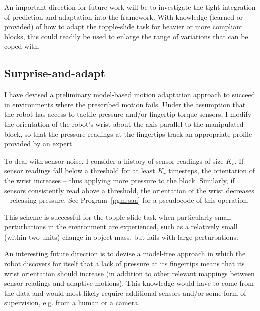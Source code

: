 An important direction for future work will be to investigate the tight integration of prediction and adaptation into the framework.  
With knowledge (learned or provided) of how to adapt the topple-slide task for heavier or more compliant blocks, this could readily be used to enlarge the range of variations that can be coped with. 

\subsection*{Surprise-and-adapt}
I have devised a preliminary model-based motion adaptation approach to succeed in environments where the prescribed motion fails.
Under the assumption that the robot has access to tactile pressure and/or fingertip torque sensors, I modify the orientation of the robot's wrist about the axis parallel to the manipulated block, so that the pressure readings at the fingertips track an appropriate profile provided by an expert.

To deal with sensor noise, I consider a history of sensor readings of size $K_r$.
If sensor readings fall below a threshold for at least $K_r$ timesteps, the orientation of the wrist increases -- thus applying more pressure to the block.
Similarly, if sensors consistently read above a threshold, the orientation of the wrist decreases -- releasing pressure.
See Program~\ref{pgm:saa} for a pseudocode of this operation.

This scheme is successful for the topple-slide task when particularly small perturbations in the environment are experienced, such as a relatively small (within two units) change in object mass, but fails with large perturbations.%

An interesting future direction is to devise a model-free approach in which the robot discovers for itself that a lack of pressure at its fingertips means that its wrist orientation should increase (in addition to other relevant mappings between sensor readings and adaptive motions).
This knowledge would have to come from the data and would most likely require additional sensors and/or some form of supervision, e.g. from a human or a camera.

